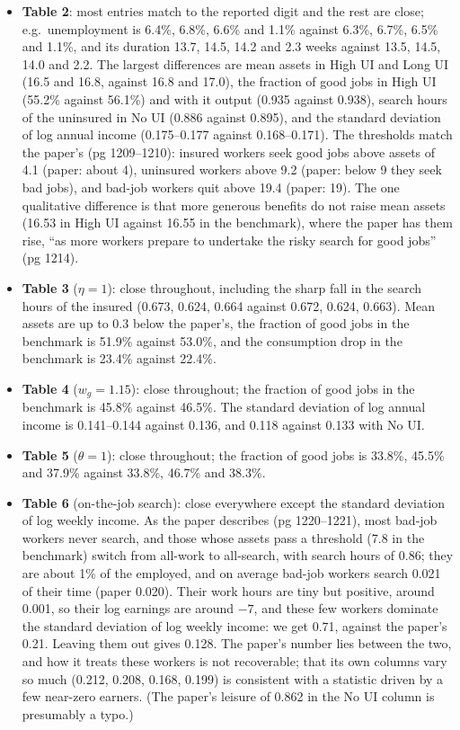 \documentclass[11pt,fleqn]{article}
\begin{document}
\begin{itemize}
 \item \textbf{Table 2}: most entries match to the reported digit and the rest are close; e.g.\ unemployment is 6.4\%, 6.8\%, 6.6\% and 1.1\% against 6.3\%, 6.7\%, 6.5\% and 1.1\%, and its duration 13.7, 14.5, 14.2 and 2.3 weeks against 13.5, 14.5, 14.0 and 2.2. The largest differences are mean assets in High UI and Long UI (16.5 and 16.8, against 16.8 and 17.0), the fraction of good jobs in High UI (55.2\% against 56.1\%) and with it output (0.935 against 0.938), search hours of the uninsured in No UI (0.886 against 0.895), and the standard deviation of log annual income (0.175--0.177 against 0.168--0.171). The thresholds match the paper's (pg 1209--1210): insured workers seek good jobs above assets of 4.1 (paper: about 4), uninsured workers above 9.2 (paper: below 9 they seek bad jobs), and bad-job workers quit above 19.4 (paper: 19). The one qualitative difference is that more generous benefits do not raise mean assets (16.53 in High UI against 16.55 in the benchmark), where the paper has them rise, ``as more workers prepare to undertake the risky search for good jobs'' (pg 1214).
 \item \textbf{Table 3} ($\eta=1$): close throughout, including the sharp fall in the search hours of the insured (0.673, 0.624, 0.664 against 0.672, 0.624, 0.663). Mean assets are up to 0.3 below the paper's, the fraction of good jobs in the benchmark is 51.9\% against 53.0\%, and the consumption drop in the benchmark is 23.4\% against 22.4\%.
 \item \textbf{Table 4} ($w_g=1.15$): close throughout; the fraction of good jobs in the benchmark is 45.8\% against 46.5\%. The standard deviation of log annual income is 0.141--0.144 against 0.136, and 0.118 against 0.133 with No UI.
 \item \textbf{Table 5} ($\theta=1$): close throughout; the fraction of good jobs is 33.8\%, 45.5\% and 37.9\% against 33.8\%, 46.7\% and 38.3\%.
 \item \textbf{Table 6} (on-the-job search): close everywhere except the standard deviation of log weekly income. As the paper describes (pg 1220--1221), most bad-job workers never search, and those whose assets pass a threshold (7.8 in the benchmark) switch from all-work to all-search, with search hours of 0.86; they are about 1\% of the employed, and on average bad-job workers search 0.021 of their time (paper 0.020). Their work hours are tiny but positive, around 0.001, so their log earnings are around $-7$, and these few workers dominate the standard deviation of log weekly income: we get 0.71, against the paper's 0.21. Leaving them out gives 0.128. The paper's number lies between the two, and how it treats these workers is not recoverable; that its own columns vary so much (0.212, 0.208, 0.168, 0.199) is consistent with a statistic driven by a few near-zero earners. (The paper's leisure of 0.862 in the No UI column is presumably a typo.)

\end{itemize}
\end{document}
